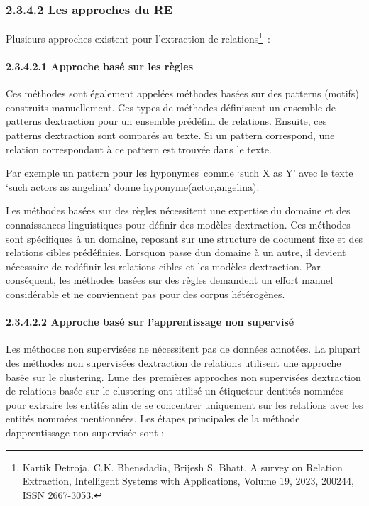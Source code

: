 \documentclass[
]{article}
\begin{document}
\subsubsection{2.3.4.2 Les approches du RE}\label{les-approches-du-re}

Plusieurs approches existent pour l'extraction de relations\footnote{Kartik
  Detroja, C.K. Bhensdadia, Brijesh S. Bhatt, A survey on Relation
  Extraction, Intelligent Systems with Applications, Volume 19, 2023,
  200244, ISSN 2667-3053.}~:

\paragraph{2.3.4.2.1 Approche basé sur les
règles}\label{approche-basuxe9-sur-les-ruxe8gles-1}

Ces méthodes sont également appelées méthodes basées sur des patterns
(motifs) construits manuellement. Ces types de méthodes définissent un
ensemble de patterns d\textquotesingle extraction pour un ensemble
prédéfini de relations. Ensuite, ces patterns
d\textquotesingle extraction sont comparés au texte. Si un pattern
correspond, une relation correspondant à ce pattern est trouvée dans le
texte.

Par exemple un pattern pour les hyponymes~comme `such X as Y' avec le
texte `such actors as angelina' donne hyponyme(actor,angelina).

Les méthodes basées sur des règles nécessitent une expertise du domaine
et des connaissances linguistiques pour définir des modèles
d\textquotesingle extraction. Ces méthodes sont spécifiques à un
domaine, reposant sur une structure de document fixe et des relations
cibles prédéfinies. Lorsqu\textquotesingle on passe d\textquotesingle un
domaine à un autre, il devient nécessaire de redéfinir les relations
cibles et les modèles d\textquotesingle extraction. Par conséquent, les
méthodes basées sur des règles demandent un effort manuel considérable
et ne conviennent pas pour des corpus hétérogènes.

\paragraph{\texorpdfstring{2.3.4.2.2 Approche basé sur l'apprentissage
non supervisé
}{2.3.4.2.2 Approche basé sur l'apprentissage non supervisé }}\label{approche-basuxe9-sur-lapprentissage-non-supervisuxe9}

Les méthodes non supervisées ne nécessitent pas de données annotées. La
plupart des méthodes non supervisées d\textquotesingle extraction de
relations utilisent une approche basée sur le clustering.
L\textquotesingle une des premières approches non supervisées
d\textquotesingle extraction de relations basée sur le clustering ont
utilisé un étiqueteur d\textquotesingle entités nommées pour extraire
les entités afin de se concentrer uniquement sur les relations avec les
entités nommées mentionnées. Les étapes principales de la méthode
d\textquotesingle apprentissage non supervisée sont :
\end{document}
